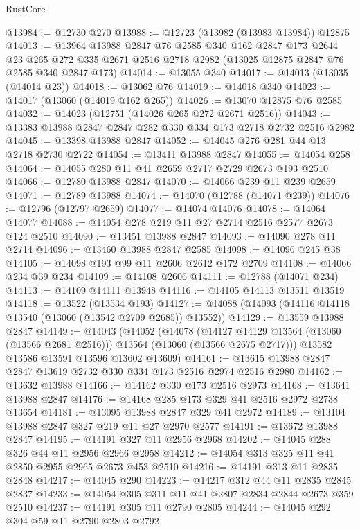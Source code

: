 \begin{lexlean}{RustCore}
\begin{coremodule}
@13984 := @12730 @270
@13988 := @12723 (@13982 (@13983 @13984)) @12875
@14013 := @13964
    @13988
    @2847
    @76
    @2585
    @340
    @162
    @2847
    @173
    @2644
    @23
    @265
    @272
    @335
    @2671
    @2516
    @2718
    @2982
    (@13025 @12875 @2847 @76 @2585 @340 @2847 @173)
@14014 := @13055 @340
@14017 := @14013 (@13035 (@14014 @23))
@14018 := @13062 @76
@14019 := @14018 @340
@14023 := @14017 (@13060 (@14019 @162 @265))
@14026 := @13070 @12875 @76 @2585
@14032 := @14023 (@12751 (@14026 @265 @272 @2671 @2516))
@14043 := @13383 @13988 @2847 @2847 @282 @330 @334 @173 @2718 @2732 @2516 @2982
@14045 := @13398 @13988 @2847
@14052 := @14045 @276 @281 @44 @13 @2718 @2730 @2722
@14054 := @13411 @13988 @2847
@14055 := @14054 @258
@14064 := @14055 @280 @11 @41 @2659 @2717 @2729 @2673 @193 @2510
@14066 := @12780 @13988 @2847
@14070 := @14066 @239 @11 @239 @2659
@14071 := @12789 @13988
@14074 := @14070 (@12788 (@14071 @239))
@14076 := @12796 (@12797 @2659)
@14077 := @14074 @14076
@14078 := @14064 @14077
@14088 := @14054 @278 @219 @11 @27 @2714 @2516 @2577 @2673 @124 @2510
@14090 := @13451 @13988 @2847
@14093 := @14090 @278 @11 @2714
@14096 := @13460 @13988 @2847 @2585
@14098 := @14096 @245 @38
@14105 := @14098 @193 @99 @11 @2606 @2612 @172 @2709
@14108 := @14066 @234 @39 @234
@14109 := @14108 @2606
@14111 := @12788 (@14071 @234)
@14113 := @14109 @14111 @13948
@14116 := @14105 @14113 @13511 @13519
@14118 := @13522 (@13534 @193)
@14127 := @14088 (@14093 (@14116 @14118 @13540 (@13060 (@13542 @2709 @2685)) @13552))
@14129 := @13559 @13988 @2847
@14149 := @14043
    (@14052
      (@14078
        (@14127 @14129 @13564 (@13060 (@13566 @2681 @2516)))
        @13564
        (@13060 (@13566 @2675 @2717)))
      @13582
      @13586
      @13591
      @13596
      @13602
      @13609)
@14161 := @13615 @13988 @2847 @2847 @13619 @2732 @330 @334 @173 @2516 @2974 @2516 @2980
@14162 := @13632 @13988
@14166 := @14162 @330 @173 @2516 @2973
@14168 := @13641 @13988 @2847
@14176 := @14168 @285 @173 @329 @41 @2516 @2972 @2738 @13654
@14181 := @13095 @13988 @2847 @329 @41 @2972
@14189 := @13104 @13988 @2847 @327 @219 @11 @27 @2970 @2577
@14191 := @13672 @13988 @2847
@14195 := @14191 @327 @11 @2956 @2968
@14202 := @14045 @288 @326 @44 @11 @2956 @2966 @2958
@14212 := @14054 @313 @325 @11 @41 @2850 @2955 @2965 @2673 @453 @2510
@14216 := @14191 @313 @11 @2835 @2848
@14217 := @14045 @290
@14223 := @14217 @312 @44 @11 @2835 @2845 @2837
@14233 := @14054 @305 @311 @11 @41 @2807 @2834 @2844 @2673 @359 @2510
@14237 := @14191 @305 @11 @2790 @2805
@14244 := @14045 @292 @304 @59 @11 @2790 @2803 @2792

\end{coremodule}
\end{lexlean}
